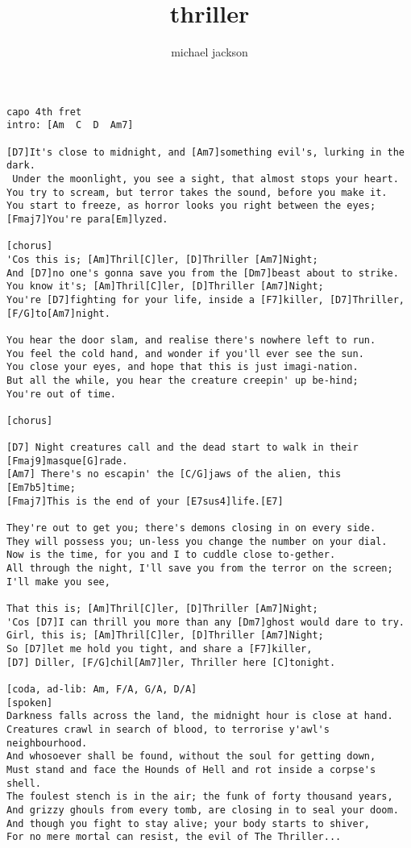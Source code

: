 \author{michael jackson}
\title{thriller}
\maketitle
\begin{verbatim}
capo 4th fret
intro: [Am  C  D  Am7]

[D7]It's close to midnight, and [Am7]something evil's, lurking in the dark.
 Under the moonlight, you see a sight, that almost stops your heart.
You try to scream, but terror takes the sound, before you make it.
You start to freeze, as horror looks you right between the eyes;
[Fmaj7]You're para[Em]lyzed.

[chorus]
'Cos this is; [Am]Thril[C]ler, [D]Thriller [Am7]Night;
And [D7]no one's gonna save you from the [Dm7]beast about to strike.
You know it's; [Am]Thril[C]ler, [D]Thriller [Am7]Night;
You're [D7]fighting for your life, inside a [F7]killer, [D7]Thriller, [F/G]to[Am7]night.

You hear the door slam, and realise there's nowhere left to run.
You feel the cold hand, and wonder if you'll ever see the sun.
You close your eyes, and hope that this is just imagi-nation.
But all the while, you hear the creature creepin' up be-hind;
You're out of time.

[chorus]

[D7] Night creatures call and the dead start to walk in their [Fmaj9]masque[G]rade.
[Am7] There's no escapin' the [C/G]jaws of the alien, this [Em7b5]time;
[Fmaj7]This is the end of your [E7sus4]life.[E7]

They're out to get you; there's demons closing in on every side.
They will possess you; un-less you change the number on your dial.
Now is the time, for you and I to cuddle close to-gether.
All through the night, I'll save you from the terror on the screen;
I'll make you see,

That this is; [Am]Thril[C]ler, [D]Thriller [Am7]Night;
'Cos [D7]I can thrill you more than any [Dm7]ghost would dare to try.
Girl, this is; [Am]Thril[C]ler, [D]Thriller [Am7]Night;
So [D7]let me hold you tight, and share a [F7]killer,
[D7] Diller, [F/G]chil[Am7]ler, Thriller here [C]tonight.

[coda, ad-lib: Am, F/A, G/A, D/A]
[spoken]
Darkness falls across the land, the midnight hour is close at hand.
Creatures crawl in search of blood, to terrorise y'awl's neighbourhood.
And whosoever shall be found, without the soul for getting down,
Must stand and face the Hounds of Hell and rot inside a corpse's shell.
The foulest stench is in the air; the funk of forty thousand years,
And grizzy ghouls from every tomb, are closing in to seal your doom.
And though you fight to stay alive; your body starts to shiver,
For no mere mortal can resist, the evil of The Thriller...
\end{verbatim}